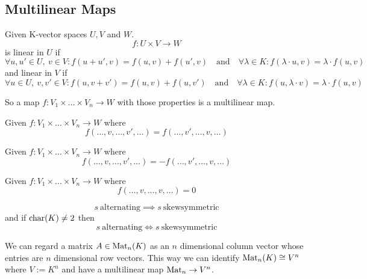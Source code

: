 \subsection{Multilinear Maps}
\begin{definition}
   Given K-vector spaces \(U, V\) and \(W\).
   \[f: U \times V \to W\]
   is linear in \(U\) if
   \[\forall u, u' \in U,~v \in V: f(u + u', v) = f(u, v) + f(u', v) \quad\text{and}\quad \forall \lambda \in K: f(\lambda \cdot u, v) = \lambda \cdot f(u,v)\]
   and linear in \(V\) if
   \[\forall u \in U,~v, v' \in V: f(u, v + v') = f(u, v) + f(u, v') \quad\text{and}\quad \forall \lambda \in K: f(u, \lambda \cdot v) = \lambda \cdot f(u,v)\]
\end{definition}
\begin{remark}
   So a map \(f: V_1 \times \ldots \times V_n \to W\) with those properties is a multilinear map.
\end{remark}

\begin{definition}
   Given \(f: V_1 \times \ldots \times V_n \to W\) where
   \[f(\ldots, v, \ldots, v', \ldots) = f(\ldots, v', \ldots, v, \ldots)\]
\end{definition}

\begin{definition}
   Given \(f: V_1 \times \ldots \times V_n \to W\) where
   \[f(\ldots, v, \ldots, v', \ldots) = -f(\ldots, v', \ldots, v, \ldots)\]
\end{definition}

\begin{definition}
   Given \(f: V_1 \times \ldots \times V_n \to W\) where
   \[f(\ldots, v, \ldots, v, \ldots) = 0\]
\end{definition}

\begin{remark}
   \[s~\text{alternating} \implies s~\text{skewsymmetric}\]
   and if \(\operatorname{char}(K) \neq 2\) then
   \[s~\text{alternating} \iff s~\text{skewsymmetric}\]
\end{remark}

\begin{remark}
   We can regard a matrix \(A \in \operatorname{Mat}_n(K)\) as an \(n\) dimensional column vector whose entries are  \(n\) dimensional row vectors.
   This way we can identify \(\operatorname{Mat}_n(K) \cong V^n\) where \(V := K^n\) and have a multilinear map \(\operatorname{Mat}_n \to V^n\).
\end{remark}

